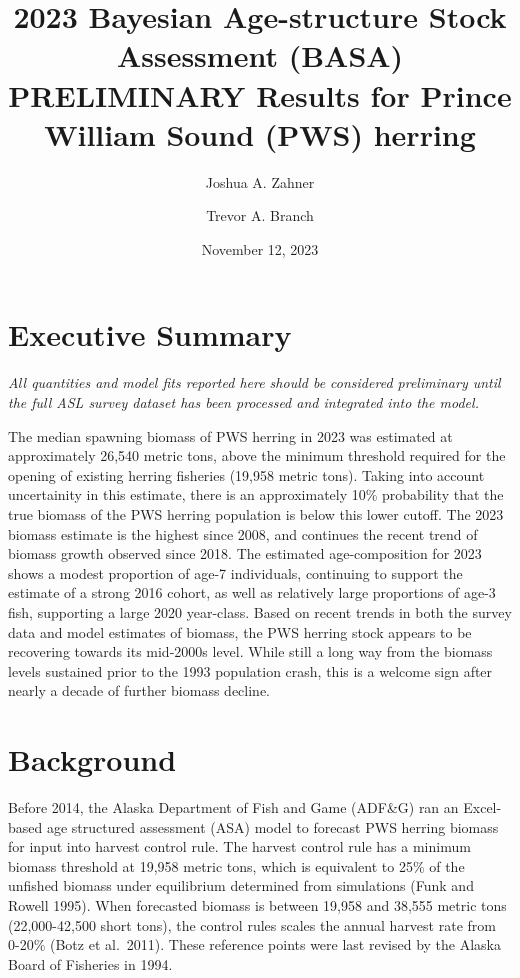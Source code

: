 \documentclass[
  11pt,
]{article}
\title{2023 Bayesian Age-structure Stock Assessment (BASA) PRELIMINARY
Results for Prince William Sound (PWS) herring}
\author{Joshua A. Zahner \and Trevor A. Branch}
\date{November 12, 2023}
\begin{document}
\maketitle

\section{Executive Summary}\label{executive-summary}

\emph{All quantities and model fits reported here should be considered
preliminary until the full ASL survey dataset has been processed and
integrated into the model.}

The median spawning biomass of PWS herring in 2023 was estimated at
approximately 26,540 metric tons, above the minimum threshold required
for the opening of existing herring fisheries (19,958 metric tons).
Taking into account uncertainity in this estimate, there is an
approximately 10\% probability that the true biomass of the PWS herring
population is below this lower cutoff. The 2023 biomass estimate is the
highest since 2008, and continues the recent trend of biomass growth
observed since 2018. The estimated age-composition for 2023 shows a
modest proportion of age-7 individuals, continuing to support the
estimate of a strong 2016 cohort, as well as relatively large
proportions of age-3 fish, supporting a large 2020 year-class. Based on
recent trends in both the survey data and model estimates of biomass,
the PWS herring stock appears to be recovering towards its mid-2000s
level. While still a long way from the biomass levels sustained prior to
the 1993 population crash, this is a welcome sign after nearly a decade
of further biomass decline.

\section{Background}\label{background}

Before 2014, the Alaska Department of Fish and Game (ADF\&G) ran an
Excel-based age structured assessment (ASA) model to forecast PWS
herring biomass for input into harvest control rule. The harvest control
rule has a minimum biomass threshold at 19,958 metric tons, which is
equivalent to 25\% of the unfished biomass under equilibrium determined
from simulations (Funk and Rowell 1995). When forecasted biomass is
between 19,958 and 38,555 metric tons (22,000-42,500 short tons), the
control rules scales the annual harvest rate from 0-20\% (Botz et
al.~2011). These reference points were last revised by the Alaska Board
of Fisheries in 1994.
\end{document}
